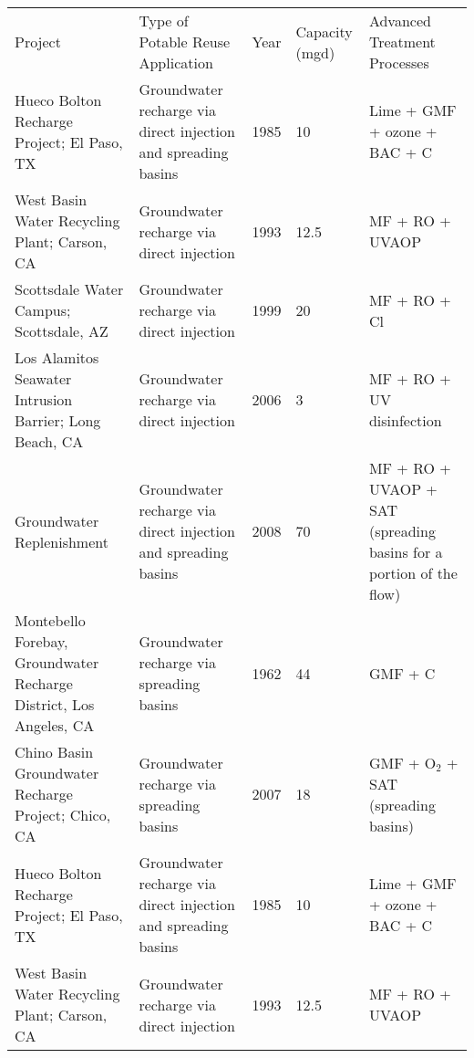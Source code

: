 \documentclass{article}
\begin{document}
\begin{table}[]
\begin{tabular}{lllll}
Project                                                            & Type of Potable Reuse Application                              & Year & Capacity (mgd) & Advanced Treatment Processes                                       \\
Hueco Bolton Recharge Project; El Paso, TX                         & Groundwater recharge via direct injection and spreading basins & 1985 & 10             & Lime + GMF + ozone + BAC + C                                       \\
West Basin Water Recycling Plant; Carson, CA                       & Groundwater recharge via direct injection                      & 1993 & 12.5           & MF + RO + UVAOP                                                    \\
Scottsdale Water Campus; Scottsdale, AZ                            & Groundwater recharge via direct injection                      & 1999 & 20             & MF + RO + Cl                                                      \\
Los Alamitos Seawater Intrusion Barrier; Long Beach, CA            & Groundwater recharge via direct injection                      & 2006 & 3              & MF + RO + UV disinfection                                          \\
Groundwater Replenishment                                          & Groundwater recharge via direct injection and spreading basins & 2008 & 70             & MF + RO + UVAOP + SAT (spreading basins for a portion of the flow) \\
Montebello Forebay, Groundwater Recharge District, Los Angeles, CA & Groundwater recharge via spreading basins                      & 1962 & 44             & GMF + C                                                            \\
Chino Basin Groundwater Recharge Project; Chico, CA                & Groundwater recharge via spreading basins                      & 2007 & 18             & GMF + O$_2$ + SAT (spreading basins)                                 
\\
Hueco Bolton Recharge Project; El Paso, TX                         & Groundwater recharge via direct injection and spreading basins & 1985 & 10             & Lime + GMF + ozone + BAC + C                                       \\
West Basin Water Recycling Plant; Carson, CA                       & Groundwater recharge via direct injection                      & 1993 & 12.5           & MF + RO + UVAOP                                                    \\

\end{tabular}
\end{table}
\end{document}
